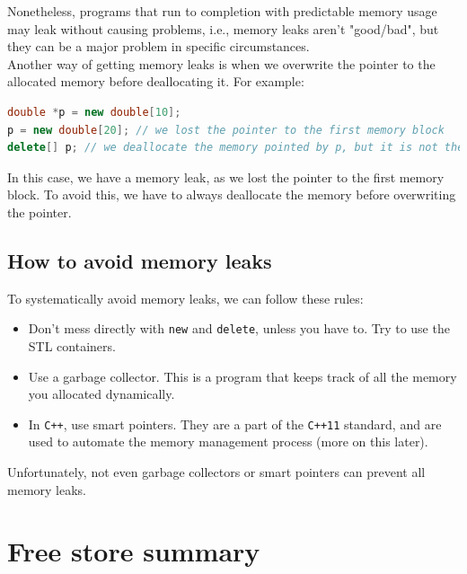 Nonetheless, programs that run to completion with predictable memory usage may leak without causing problems, i.e., memory
leaks aren't "good/bad", but they can be a major problem in specific circumstances.\\

Another way of getting memory leaks is when we overwrite the pointer to the allocated memory before deallocating it. For example:\\

\begin{lstlisting}[language=C++]
double *p = new double[10];
p = new double[20]; // we lost the pointer to the first memory block
delete[] p; // we deallocate the memory pointed by p, but it is not the memory we allocated
\end{lstlisting}

In this case, we have a memory leak, as we lost the pointer to the first memory block. To avoid this, we have to always deallocate
the memory before overwriting the pointer.\\

\subsection{How to avoid memory leaks}

To systematically avoid memory leaks, we can follow these rules:

\begin{itemize}
    \item Don't mess directly with \texttt{new} and \texttt{delete}, unless you have to. Try to use the STL containers.
    \item Use a garbage collector. This is a program that keeps track of all the memory you allocated dynamically.
    \item In \texttt{C++}, use smart pointers. They are a part of the \texttt{C++11} standard, and are used to automate 
    the memory management process (more on this later).
\end{itemize}

Unfortunately, not even garbage collectors or smart pointers can prevent all memory leaks.

\section{Free store summary}

